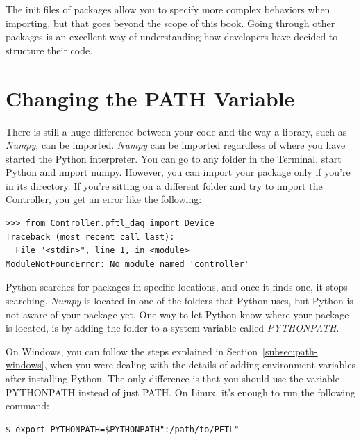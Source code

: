 
The init files of packages allow you to specify more complex behaviors when importing, but that goes beyond the scope of this book. Going through other packages is an excellent way of understanding how developers have decided to structure their code.

\section{Changing the PATH Variable}\label{sec:path}
There is still a huge difference between your code and the way a library, such as \emph{Numpy}, can be imported. \emph{Numpy} can be imported regardless of where you have started the Python interpreter. You can go to any folder in the Terminal, start Python and import numpy. However, you can import your package only if you're in its directory. If you're sitting on a different folder and try to import the Controller, you get an error like the following:

\begin{verbatim}
>>> from Controller.pftl_daq import Device
Traceback (most recent call last):
  File "<stdin>", line 1, in <module>
ModuleNotFoundError: No module named 'controller'
\end{verbatim}

Python searches for packages in specific locations, and once it finds one, it stops searching. \emph{Numpy} is located in one of the folders that Python uses, but Python is not aware of your package yet. One way to let Python know where your package is located, is by adding the folder to a system variable called \emph{PYTHONPATH}.

On Windows, you can follow the steps explained in Section~\ref{subsec:path-windows}, when you were dealing with the details of adding environment variables after installing Python. The only difference is that you should use the variable PYTHONPATH instead of just PATH. On Linux, it's enough to run the following command:

\begin{verbatim}
$ export PYTHONPATH=$PYTHONPATH":/path/to/PFTL"
\end{verbatim}

